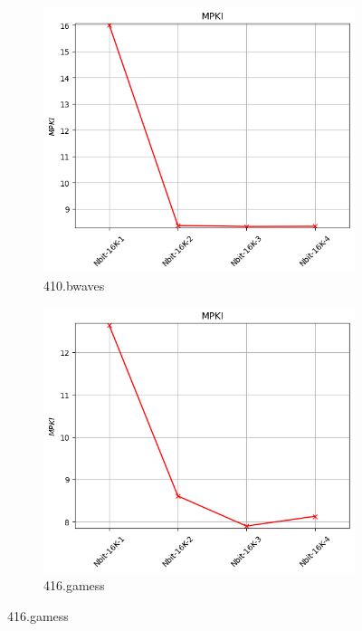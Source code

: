 \documentclass{article}
\begin{document}
\begin{figure}[H]
    \vspace{0.5cm} %

    \begin{subfigure}[b]{0.45\textwidth}
        \includegraphics[width=\textwidth]{figures/5_3/410.bwaves.cslab_branch_preds_ref.out.png}
        \caption{410.bwaves}
        \label{fig:plot3}
    \end{subfigure}
    \hfill
    \begin{subfigure}[b]{0.45\textwidth}
        \includegraphics[width=\textwidth]{figures/5_3/416.gamess.cslab_branch_preds_ref.out.png}
        \caption{416.gamess}
        \label{fig:plot4}
    \end{subfigure}


\end{figure}
\end{document}
